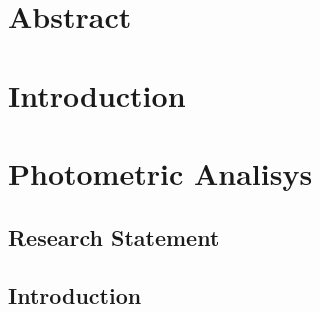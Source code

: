 \documentclass[12pt]{article}
\providecommand\phantomsection{} %
\begin{document}
\newpage
\phantomsection
{}
\section*{\centering Abstract}

\newpage
{}

\section{Introduction}
\label{sec:introduction}

%
%
%
%
%

\section{Photometric Analisys}
\label{sec:photometry}

\subsection{Research Statement}
\label{sec:rs_photometry}

\subsection{Introduction}
\label{sec_IMF:introduction}
\end{document}
